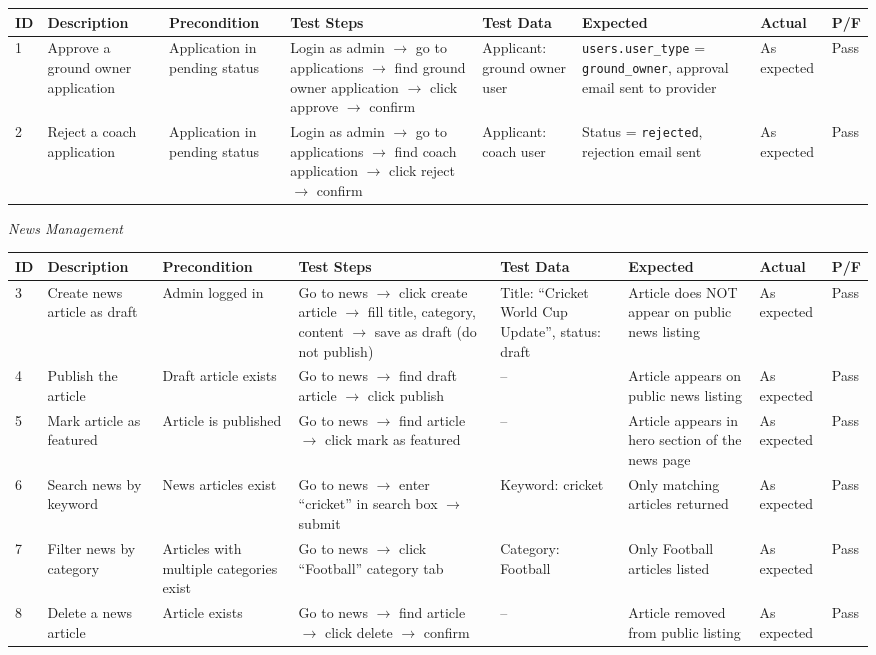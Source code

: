 \documentclass[12pt,a4paper]{report}
\begin{document}
\begin{center}
\footnotesize
\begin{longtable}{p{0.4cm} p{2.2cm} p{1.8cm} p{3.2cm} p{2.2cm} p{2.2cm} p{1.4cm} p{0.8cm}}
\toprule
\textbf{ID} & \textbf{Description} & \textbf{Precondition} & \textbf{Test Steps} & \textbf{Test Data} & \textbf{Expected} & \textbf{Actual} & \textbf{P/F}\\
\midrule
\endhead
1 & Approve a ground owner application & Application in pending status & Login as admin $\to$ go to applications $\to$ find ground owner application $\to$ click approve $\to$ confirm & Applicant: ground owner user & \texttt{users.user\_type} = \texttt{ground\_owner}, approval email sent to provider & As expected & Pass\\[4pt]
2 & Reject a coach application & Application in pending status & Login as admin $\to$ go to applications $\to$ find coach application $\to$ click reject $\to$ confirm & Applicant: coach user & Status = \texttt{rejected}, rejection email sent & As expected & Pass\\
\bottomrule
\end{longtable}
\end{center}

\textit{News Management}

\begin{center}
\footnotesize
\begin{longtable}{p{0.4cm} p{2.2cm} p{1.8cm} p{3.2cm} p{2.2cm} p{2.2cm} p{1.4cm} p{0.8cm}}
\toprule
\textbf{ID} & \textbf{Description} & \textbf{Precondition} & \textbf{Test Steps} & \textbf{Test Data} & \textbf{Expected} & \textbf{Actual} & \textbf{P/F}\\
\midrule
\endhead
3 & Create news article as draft & Admin logged in & Go to news $\to$ click create article $\to$ fill title, category, content $\to$ save as draft (do not publish) & Title: ``Cricket World Cup Update'', status: draft & Article does NOT appear on public news listing & As expected & Pass\\[4pt]
4 & Publish the article & Draft article exists & Go to news $\to$ find draft article $\to$ click publish & -- & Article appears on public news listing & As expected & Pass\\[4pt]
5 & Mark article as featured & Article is published & Go to news $\to$ find article $\to$ click mark as featured & -- & Article appears in hero section of the news page & As expected & Pass\\[4pt]
6 & Search news by keyword & News articles exist & Go to news $\to$ enter ``cricket'' in search box $\to$ submit & Keyword: cricket & Only matching articles returned & As expected & Pass\\[4pt]
7 & Filter news by category & Articles with multiple categories exist & Go to news $\to$ click ``Football'' category tab & Category: Football & Only Football articles listed & As expected & Pass\\[4pt]
8 & Delete a news article & Article exists & Go to news $\to$ find article $\to$ click delete $\to$ confirm & -- & Article removed from public listing & As expected & Pass\\
\bottomrule
\end{longtable}
\end{center}
\end{document}
